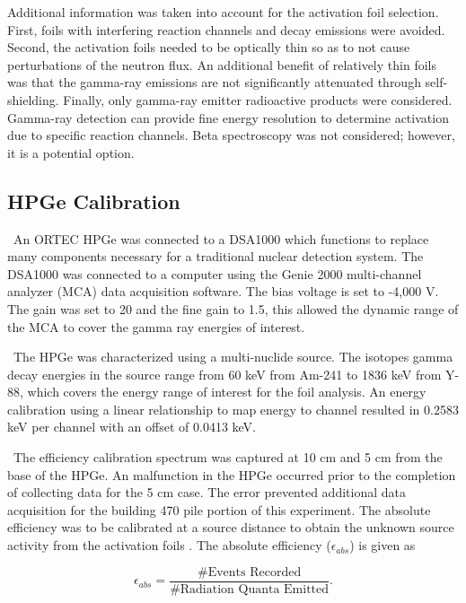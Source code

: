 \documentclass[journal]{IEEEtran}
\begin{document}
	Additional information was taken into account for the activation foil selection. First, foils with interfering reaction channels and decay emissions were avoided. Second, the activation foils needed to be optically thin so as to not cause perturbations of the neutron flux. An additional benefit of relatively thin foils was that the gamma-ray emissions are not significantly attenuated through self-shielding. Finally, only gamma-ray emitter radioactive products were considered. Gamma-ray detection can provide fine energy resolution to determine activation due to specific reaction channels. Beta spectroscopy was not considered; however, it is a potential option. 
	
\subsection{HPGe Calibration}

\ An ORTEC HPGe was connected to a DSA1000 which functions to replace many components necessary for a traditional nuclear detection system. The DSA1000 was connected to a computer using the Genie 2000 multi-channel analyzer (MCA) data acquisition software. The bias voltage is set to -4,000 V. The gain was set to 20 and the fine gain to 1.5, this allowed the dynamic range of the MCA to cover the gamma ray energies of interest. 

\ The HPGe was characterized using a multi-nuclide source. The isotopes gamma decay energies in the source range from 60 keV from Am-241 to 1836 keV from Y-88, which covers the energy range of interest for the foil analysis. An energy calibration using a linear relationship to map energy to channel resulted in 0.2583 keV per channel with an offset of 0.0413 keV. 

\ The efficiency calibration spectrum was captured at 10 cm and 5 cm from the base of the HPGe. An malfunction in the HPGe occurred prior to the completion of collecting data for the 5 cm case. The error prevented additional data acquisition for the building 470 pile portion of this experiment. The absolute efficiency was to be calibrated at a source distance to obtain the unknown source activity from the activation foils \cite{Knoll}. The absolute efficiency ($\epsilon_{abs}$) is given as

\begin{equation} \label{eq:effa}
\epsilon_{abs} =\frac{\text{\# Events Recorded}}{\text{\# Radiation Quanta Emitted}}.
\end{equation}
\end{document}
